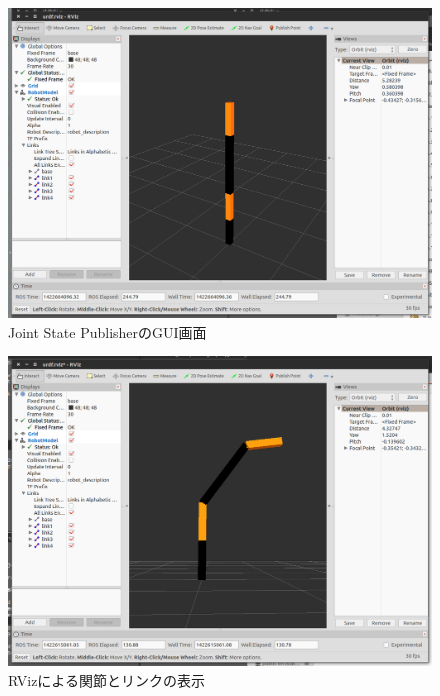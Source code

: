 \begin{figure}[ht]
  \centering
  \includegraphics[width=\columnwidth]{pictures/chapter11/pic_11_08.png}
  \caption{Joint State PublisherのGUI画面}
\end{figure}

\begin{figure}[ht]
  \centering
  \includegraphics[width=\columnwidth]{pictures/chapter11/pic_11_09.png}
  \caption{RVizによる関節とリンクの表示}
\end{figure}

